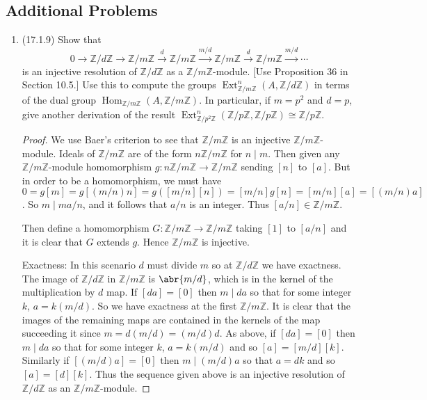 \documentclass[11pt]{article}
\DeclareMathOperator{\Hom}{Hom}
\DeclareMathOperator{\Ext}{Ext}
\begin{document}
\subsection*{Additional Problems}
\begin{enumerate}
    \item (17.1.9)
    Show that \[0\to \mathbb{Z}/d\mathbb{Z}\to\mathbb{Z}/m\mathbb{Z}\xrightarrow{d}\mathbb{Z}/m\mathbb{Z}\xrightarrow{m/d}\mathbb{Z}/m\mathbb{Z}\xrightarrow{d}\mathbb{Z}/m\mathbb{Z}\xrightarrow{m/d}\cdots \] is an injective resolution of $\mathbb{Z}/d\mathbb{Z}$ as a $\mathbb{Z}/m\mathbb{Z}$-module. [Use Proposition 36 in Section 10.5.] Use this to compute the groups $\Ext_{\mathbb{Z}/m\mathbb{Z}}^n(A,\mathbb{Z}/d\mathbb{Z})$ in terms of the dual group $\Hom_{\mathbb{Z}/m\mathbb{Z}}(A,\mathbb{Z}/m\mathbb{Z})$. In particular, if $m = p^2$ and $d = p$, give another derivation of the result $\Ext_{\mathbb{Z}/p^2\mathbb{Z}}^n(\mathbb{Z}/p\mathbb{Z},\mathbb{Z}/p\mathbb{Z})\cong \mathbb{Z}/p\mathbb{Z}$. \begin{proof}
        We use Baer's criterion to see that $\mathbb{Z}/m\mathbb{Z}$ is an injective $\mathbb{Z}/m\mathbb{Z}$-module. Ideals of $\mathbb{Z}/m\mathbb{Z}$ are of the form $n\mathbb{Z}/m\mathbb{Z}$ for $n\mid m$. Then given any $\mathbb{Z}/m\mathbb{Z}$-module homomorphism $g\colon n\mathbb{Z}/m\mathbb{Z}\to \mathbb{Z}/m\mathbb{Z}$ sending $[n]$ to $[a]$. But in order to be a homomorphism, we must have $0 = g[m] = g[(m/n)n] = g([m/n][n]) = [m/n]g[n] = [m/n][a] = [(m/n)a] $. So $m\mid ma/n$, and it follows that $a/n$ is an integer. Thus $[a/n]\in \mathbb{Z}/m\mathbb{Z}$.
        
        Then define a homomorphism $G\colon \mathbb{Z}/m\mathbb{Z}\to \mathbb{Z}/m\mathbb{Z}$ taking $[1]$ to $[a/n]$ and it is clear that $G$ extends $g$. Hence $\mathbb{Z}/m\mathbb{Z}$ is injective.

        Exactness: In this scenario $d$ must divide $m$ so at $\mathbb{Z}/d\mathbb{Z}$ we have exactness. The image of $\mathbb{Z}/d\mathbb{Z}$ in $\mathbb{Z}/m\mathbb{Z}$ is $\abr{m/d}$, which is in the kernel of the multiplication by $d$ map. If $[da] = [0]$ then $m\mid da$ so that for some integer $k$, $a = k(m/d)$. So we have exactness at the first $\mathbb{Z}/m\mathbb{Z}$. It is clear that the images of the remaining maps are contained in the kernels of the map succeeding it since $m = d(m/d) = (m/d)d$. As above, if $[da] = [0]$ then $m\mid da$ so that for some integer $k$, $a = k(m/d)$ and so $[a] = [m/d][k]$. Similarly if $[(m/d)a] = [0]$ then $m\mid (m/d)a$ so that $a=dk$ and so $[a] = [d][k]$. Thus the sequence given above is an injective resolution of $\mathbb{Z}/d\mathbb{Z}$ as an $\mathbb{Z}/m\mathbb{Z}$-module.


\end{proof}
\end{enumerate}
\end{document}
